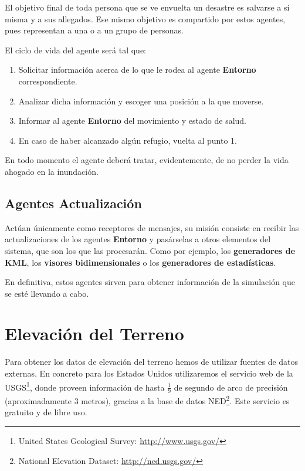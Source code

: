 El objetivo final de toda persona que se ve envuelta un desastre es salvarse a
sí misma y a sus allegados. Ese mismo objetivo es compartido por estos agentes,
pues representan a una o a un grupo de personas.

El ciclo de vida del agente será tal que:

\begin{enumerate}
 \item Solicitar información acerca de lo que le rodea al agente {\bf
Entorno} correspondiente.
 \item Analizar dicha información y escoger una posición a la que moverse.
 \item Informar al agente {\bf Entorno} del movimiento y estado de salud.
 \item En caso de haber alcanzado algún refugio, vuelta al punto 1.
\end{enumerate}

En todo momento el agente deberá tratar, evidentemente, de no perder la vida
ahogado en la inundación.

\subsection*{Agentes Actualización}

Actúan únicamente como receptores de mensajes, su misión consiste en recibir
las actualizaciones de los agentes {\bf Entorno} y pasárselas a otros elementos
del sistema, que son los que las procesarán. Como por ejemplo, los {\bf
generadores de KML}, los {\bf visores bidimensionales} o los {\bf generadores de
estadísticas}.

En definitiva, estos agentes sirven para obtener información de la simulación
que se esté llevando a cabo.

\section*{Elevación del Terreno}

Para obtener los datos de elevación del terreno hemos de utilizar fuentes de
datos externas. En concreto para los Estados Unidos utilizaremos el servicio
web de la USGS\footnote{United States Geological Survey:
\url{http://www.usgs.gov/}}, donde proveen información de hasta $ \tfrac{1}{9} $
de segundo de arco de precisión (aproximadamente 3 metros), gracias a la base de
datos NED\footnote{National Elevation Dataset: \url{http://ned.usgs.gov/}}. Este
servicio es gratuito y de libre uso.

